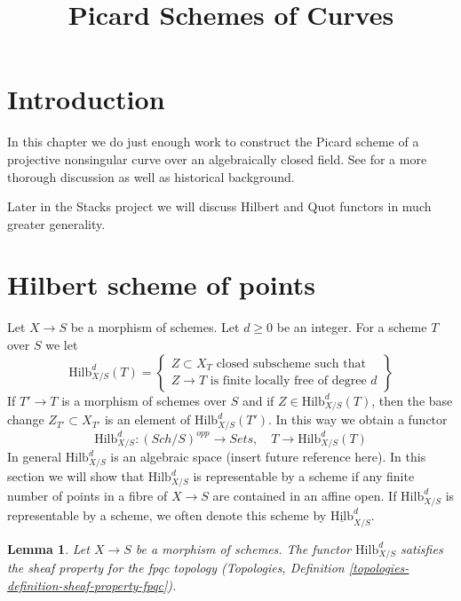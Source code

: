 \documentclass{stacks-project}
\theoremstyle{plain}
\newtheorem{lemma}[subsection]{Lemma}
\theoremstyle{definition}
\theoremstyle{remark}
\numberwithin{equation}{subsection}
\def\Sch{\mathit{Sch}}
\def\Hilbfunctor{\mathrm{Hilb}}
\begin{document}
\title{Picard Schemes of Curves}


\maketitle

\label{section-phantom}

\tableofcontents


\section{Introduction}
\label{section-introduction}

\noindent
In this chapter we do just enough work to construct the Picard scheme
of a projective nonsingular curve over an algebraically closed field.
See \cite{Kleiman-Picard} for a more thorough discussion as well as
historical background.

\medskip\noindent
Later in the Stacks project we will discuss Hilbert and Quot functors
in much greater generality.


\section{Hilbert scheme of points}
\label{section-hilbert-scheme-points}

\noindent
Let $X \to S$ be a morphism of schemes. Let $d \geq 0$ be an integer.
For a scheme $T$ over $S$ we let
$$
\Hilbfunctor^d_{X/S}(T) =
\left\{
\begin{matrix}
Z \subset X_T\text{ closed subscheme such that }\\
Z \to T\text{ is finite locally free of degree }d
\end{matrix}
\right\}
$$
If $T' \to T$ is a morphism of schemes over $S$ and if
$Z \in \Hilbfunctor^d_{X/S}(T)$, then the base change
$Z_{T'} \subset X_{T'}$ is an element of $\Hilbfunctor^d_{X/S}(T')$.
In this way we obtain a functor
$$
\Hilbfunctor^d_{X/S} :
(\Sch/S)^{opp} \longrightarrow \textit{Sets},\quad
T \longrightarrow \Hilbfunctor^d_{X/S}(T)
$$
In general $\Hilbfunctor^d_{X/S}$ is an algebraic space
(insert future reference here). In this section we will
show that $\Hilbfunctor^d_{X/S}$ is representable
by a scheme if any finite number of points in a fibre of
$X \to S$ are contained in an affine open.
If $\Hilbfunctor^d_{X/S}$ is representable by a scheme, we often
denote this scheme by $\underline{\Hilbfunctor}^d_{X/S}$.

\begin{lemma}
\label{lemma-hilb-d-sheaf}
Let $X \to S$ be a morphism of schemes. The functor $\Hilbfunctor^d_{X/S}$
satisfies the sheaf property for the fpqc topology
(Topologies, Definition \ref{topologies-definition-sheaf-property-fpqc}).
\end{lemma}
\end{document}
